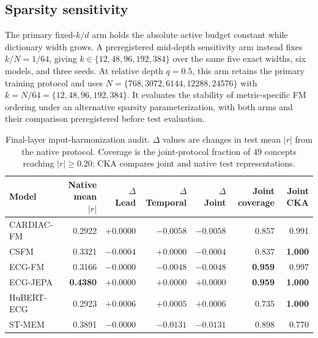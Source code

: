 \subsection{Sparsity sensitivity}

The primary fixed-$k/d$ arm holds the absolute active budget constant while dictionary width grows. A preregistered mid-depth sensitivity arm instead fixes $k/N=1/64$, giving $k\in\{12,48,96,192,384\}$ over the same five exact widths, six models, and three seeds. At relative depth $q=0.5$, this arm retains the primary training protocol and uses $N=\{768,3072,6144,12288,24576\}$ with $k=N/64=\{12,48,96,192,384\}$. It evaluates the stability of metric-specific FM ordering under an alternative sparsity parameterization, with both arms and their comparison preregistered before test evaluation.

\begin{table}[t]
  \centering
  \caption{Final-layer input-harmonization audit. $\Delta$ values are changes in test mean $|r|$ from the native protocol. Coverage is the joint-protocol fraction of 49 concepts reaching $|r|\geq0.20$; CKA compares joint and native test representations.}
  \label{tab:input-harmonization}
  \begin{tabular}{lrrrrrr}
    \toprule
    Model & Native mean $|r|$ & $\Delta$ Lead & $\Delta$ Temporal & $\Delta$ Joint & Joint coverage & Joint CKA \\
    \midrule
    CARDIAC-FM & 0.2922 & $+0.0000$ & $-0.0058$ & $-0.0058$ & 0.857 & 0.991 \\
    CSFM       & 0.3321 & $-0.0004$ & $+0.0000$ & $-0.0004$ & 0.837 & \textbf{1.000} \\
    ECG-FM     & 0.3166 & $-0.0000$ & $-0.0048$ & $-0.0048$ & \textbf{0.959} & 0.997 \\
    ECG-JEPA   & \textbf{0.4380} & $+0.0000$ & $+0.0000$ & $+0.0000$ & \textbf{0.959} & \textbf{1.000} \\
    HuBERT-ECG & 0.2923 & $\boldsymbol{+0.0006}$ & $\boldsymbol{+0.0005}$ & $\boldsymbol{+0.0006}$ & 0.735 & \textbf{1.000} \\
    ST-MEM     & 0.3891 & $-0.0000$ & $-0.0131$ & $-0.0131$ & 0.898 & 0.770 \\
    \bottomrule
  \end{tabular}
\end{table}

